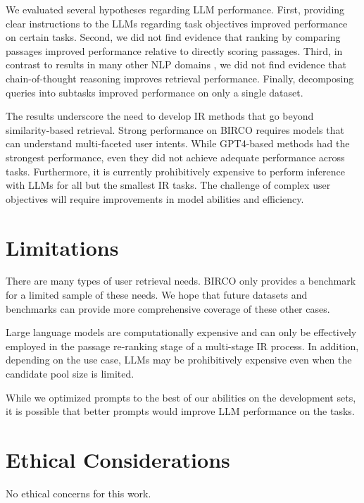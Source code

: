 \documentclass[11pt]{article}
\begin{document}
We evaluated several hypotheses regarding LLM performance. First, providing clear instructions to the LLMs regarding task objectives improved performance on certain tasks. Second, we did not find evidence that ranking by comparing passages improved performance relative to directly scoring passages. Third, in contrast to results in many other NLP domains \cite{cot1,cot4}, we did not find evidence that chain-of-thought reasoning improves retrieval performance. Finally, decomposing queries into subtasks improved performance on only a single dataset.

The results underscore the need to develop IR methods that go beyond similarity-based retrieval. Strong performance on BIRCO requires models that can understand multi-faceted user intents. While GPT4-based methods had the strongest performance, even they did not achieve adequate performance across tasks. Furthermore, it is currently prohibitively expensive to perform inference with LLMs for all but the smallest IR tasks. The challenge of complex user objectives will require improvements in model abilities and efficiency.

\newpage

\section{Limitations}

There are many types of user retrieval needs. BIRCO only provides a benchmark for a limited sample of these needs. We hope that future datasets and benchmarks can provide more comprehensive coverage of these other cases. 

Large language models are computationally expensive and can only be effectively employed in the passage re-ranking stage of a multi-stage IR process. In addition, depending on the use case, LLMs may be prohibitively expensive even when the candidate pool size is limited.

While we optimized prompts to the best of our abilities on the development sets, it is possible that better prompts would improve LLM performance on the tasks.

\section{Ethical Considerations}

No ethical concerns for this work.

\newpage


\newpage
\appendix
\end{document}
